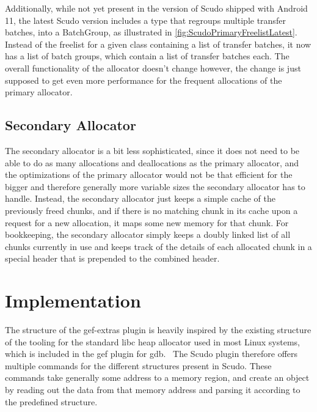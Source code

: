\documentclass[a4paper,11pt,oneside]{report}
\begin{document}
Additionally, while not yet present in the version of Scudo shipped with Android
11, the latest Scudo version includes a type that regroups multiple transfer
batches, into a BatchGroup, as illustrated in \autoref{fig:ScudoPrimaryFreelistLatest}.
Instead of the freelist for a given class containing
a list of transfer batches, it now has a list of batch groups, which contain
a list of transfer batches each. The overall functionality of the allocator
doesn't change however, the change is just supposed to get even more performance
for the frequent allocations of the primary allocator.

\section{Secondary Allocator}

The secondary allocator is a bit less sophisticated, since it does not need to
be able to do as many allocations and deallocations as the primary allocator,
and the optimizations of the primary allocator would not be that efficient for
the bigger and therefore generally more variable sizes the secondary allocator
has to handle. Instead, the secondary allocator just keeps a simple cache of
the previously freed chunks, and if there is no matching chunk in its cache
upon a request for a new allocation, it maps some new memory for that chunk.
For bookkeeping, the secondary allocator simply keeps a doubly linked list of
all chunks currently in use and keeps track of the details of each allocated
chunk in a special header that is prepended to the combined header.

\chapter{Implementation}

The structure of the gef-extras plugin is heavily inspired by the existing
structure of the tooling for the standard libc heap allocator used in most
Linux systems, which is included in the gef plugin for gdb.~\cite{gef} The
Scudo plugin therefore offers multiple commands for the different structures
present in Scudo. These commands take generally some address to a memory
region, and create an object by reading out the data from that memory address
and parsing it according to the predefined structure.
\end{document}
